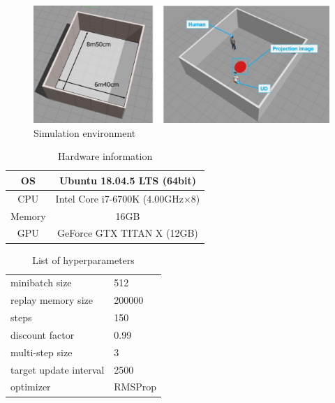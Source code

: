 \documentclass[12pt]{sonota/aislab}
\begin{document}
\begin{figure}[t]
\begin{center}
\includegraphics[clip, width=12cm]{figs/experiment_environment.eps}
\caption{Simulation environment}
\label{gazebo}
\end{center}
\end{figure}

\begin{table}[t]
	\caption{Hardware information}
	\label{table:conmupter_experiment}
	\centering 
	\begin{tabular}[tbp]{|c|c|}
		\hline 
		OS & Ubuntu 18.04.5 LTS (64bit) \\\hline
		CPU & Intel Core i7-6700K (4.00GHz$\times$8) \\\hline
		Memory & 16GB \\\hline
		GPU & GeForce GTX TITAN X (12GB) \\\hline
	\end{tabular}
\end{table}

\begin{table}[t]
	\caption{List of hyperparameters}
	\label{table:list_hyperpaeameters}
	\centering 
	\begin{tabular}[tbp]{ll}
		\hline 
		minibatch size & 512 \\
		replay memory size & 200000 \\
		steps & 150 \\
		discount factor & 0.99 \\
		multi-step size & 3 \\
		target update interval & 2500 \\
		optimizer & RMSProp
		
	\end{tabular}
\end{table}
\end{document}
